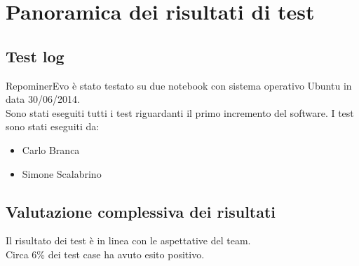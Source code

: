 \chapter{Panoramica dei risultati di test}

\section{Test log}

RepominerEvo è stato testato su due notebook con sistema operativo Ubuntu in data 30/06/2014.\\
Sono stati eseguiti tutti i test riguardanti il primo incremento del software.
I test sono stati eseguiti da:
\begin{itemize}
\item Carlo Branca
\item Simone Scalabrino
\end{itemize}

\section{Valutazione complessiva dei risultati}

Il risultato dei test è in linea con le aspettative del team.\\
Circa 6\% dei test case ha avuto esito positivo.\\

\clearpage